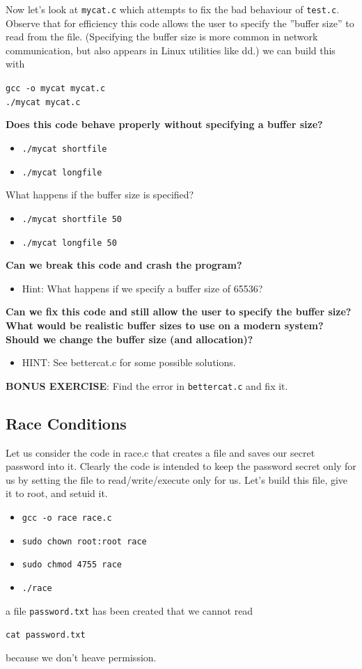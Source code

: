 \documentclass{article}
\begin{document}
\noindent Now let’s look at \lstinline{mycat.c} which attempts to fix the bad behaviour of
\lstinline{test.c}. Observe that for efficiency this code allows the user to specify the
”buffer size” to read from the file. (Specifying the buffer size is more common
in network communication, but also appears in Linux utilities like dd.)
we can build this with
\begin{center}
    \lstinline{gcc -o mycat mycat.c}\\
    \lstinline{./mycat mycat.c}
\end{center}
\noindent \textbf{Does this code behave properly without specifying a buffer size?}
 \begin{itemize}
    \item \lstinline{./mycat shortfile}
    \item \lstinline{./mycat longfile}
\end{itemize}
\noindent What happens if the buffer size is specified?
 \begin{itemize}
    \item \lstinline{./mycat shortfile 50}
    \item \lstinline{./mycat longfile 50}
\end{itemize}
\noindent \textbf{Can we break this code and crash the program?}
\begin{itemize}
    \item Hint: What happens if we specify a buffer size of 65536?
\end{itemize}
\noindent \textbf{Can we fix this code and still allow the user to specify the
buffer size? What would be realistic buffer sizes to use on a modern
system? Should we change the buffer size (and allocation)?}
\begin{itemize}
    \item HINT: See bettercat.c for some possible solutions.
\end{itemize}

\noindent \textbf{BONUS EXERCISE}: Find the error in \lstinline{bettercat.c} and fix it.


\subsection{Race Conditions}
Let us consider the code in race.c that creates a file and saves our secret
password into it. Clearly the code is intended to keep the password secret
only for us by setting the file to read/write/execute only for us. Let’s build
this file, give it to root, and setuid it.
 \begin{itemize}
    \item \lstinline{gcc -o race race.c}
    \item \lstinline{sudo chown root:root race}
    \item \lstinline{sudo chmod 4755 race}
    \item \lstinline{./race}
\end{itemize}
a file \lstinline{password.txt} has been created that we cannot read
\begin{center}
    \lstinline{cat password.txt}
\end{center}
\noindent because we don’t heave permission.\\
\end{document}
